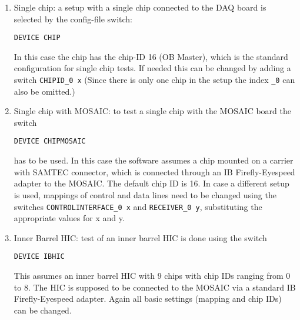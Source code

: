 \documentclass{article}
\begin{document}
\begin {enumerate}
\item Single chip: a setup with a single chip connected to the DAQ board is selected by the config-file switch:
\begin{verbatim}
DEVICE CHIP
\end{verbatim}

In this case the chip has the chip-ID 16 (OB Master), which is the standard configuration for single chip tests. If needed this can be changed by adding a switch \texttt{CHIPID\_0 x} (Since there is only one chip in the setup the index \texttt{\_0} can also be omitted.)

\item Single chip with MOSAIC: to test a single chip with the MOSAIC board the switch
\begin{verbatim}
DEVICE CHIPMOSAIC
\end{verbatim}
has to be used. In this case the software assumes a chip mounted on a carrier with SAMTEC connector, which is connected through an IB Firefly-Eyespeed adapter to the MOSAIC. The default chip ID is 16. In case a different setup is used, mappings of control and data lines need to be changed using the switches \texttt{CONTROLINTERFACE\_0 x} and \texttt{RECEIVER\_0 y}, substituting the appropriate values for x and y.

\item Inner Barrel HIC: test of an inner barrel HIC is done using the switch
\begin{verbatim}
DEVICE IBHIC
\end{verbatim}
This assumes an inner barrel HIC with 9 chips with chip IDs ranging from 0 to 8. The HIC is supposed to be connected to the MOSAIC via a standard IB Firefly-Eyespeed adapter. Again all basic settings (mapping and chip IDs) can be changed.


\end{enumerate}
\end{document}
